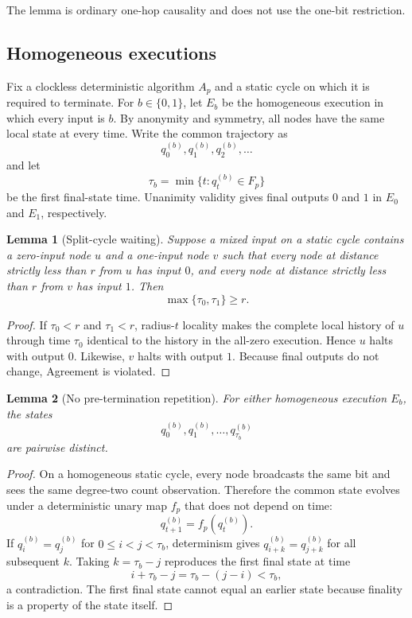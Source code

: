 \documentclass[11pt]{article}
\newtheorem{lemma}{Lemma}
\theoremstyle{remark}
\begin{document}
The lemma is ordinary one-hop causality and does not use the one-bit restriction.

\subsection{Homogeneous executions}
Fix a clockless deterministic algorithm $A_p$ and a static cycle on which it is required to terminate. For $b\in\{0,1\}$, let $E_b$ be the homogeneous execution in which every input is $b$. By anonymity and symmetry, all nodes have the same local state at every time. Write the common trajectory as
\[
q_0^{(b)},q_1^{(b)},q_2^{(b)},\ldots
\]
and let
\[
\tau_b=\min\{t:q_t^{(b)}\in F_p\}
\]
be the first final-state time. Unanimity validity gives final outputs $0$ and $1$ in $E_0$ and $E_1$, respectively.

\begin{lemma}[Split-cycle waiting]
Suppose a mixed input on a static cycle contains a zero-input node $u$ and a one-input node $v$ such that every node at distance strictly less than $r$ from $u$ has input $0$, and every node at distance strictly less than $r$ from $v$ has input $1$. Then
\[
\max\{\tau_0,\tau_1\}\ge r.
\]
\end{lemma}
\begin{proof}
If $\tau_0<r$ and $\tau_1<r$, radius-$t$ locality makes the complete local history of $u$ through time $\tau_0$ identical to the history in the all-zero execution. Hence $u$ halts with output $0$. Likewise, $v$ halts with output $1$. Because final outputs do not change, Agreement is violated.
\end{proof}

\begin{lemma}[No pre-termination repetition]
For either homogeneous execution $E_b$, the states
\[
q_0^{(b)},q_1^{(b)},\ldots,q_{\tau_b}^{(b)}
\]
are pairwise distinct.
\end{lemma}
\begin{proof}
On a homogeneous static cycle, every node broadcasts the same bit and sees the same degree-two count observation. Therefore the common state evolves under a deterministic unary map $f_p$ that does not depend on time:
\[
q_{t+1}^{(b)}=f_p(q_t^{(b)}).
\]
If $q_i^{(b)}=q_j^{(b)}$ for $0\le i<j<\tau_b$, determinism gives $q_{i+k}^{(b)}=q_{j+k}^{(b)}$ for all subsequent $k$. Taking $k=\tau_b-j$ reproduces the first final state at time
\[
i+\tau_b-j=\tau_b-(j-i)<\tau_b,
\]
a contradiction. The first final state cannot equal an earlier state because finality is a property of the state itself.
\end{proof}
\end{document}
